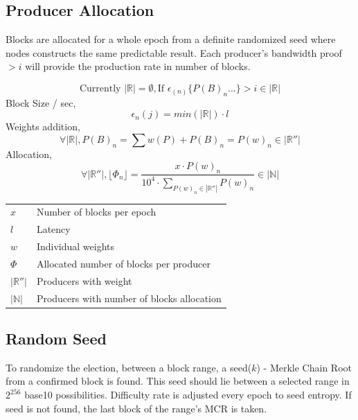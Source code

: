 \documentclass[a4paper,10pt]{article}
\makeatletter
\newenvironment{conditions}
  {\par\vspace{\abovedisplayskip}\noindent\begin{tabular}{>{$}l<{$} @{${}={}$} l}}
  {\end{tabular}\par\vspace{\belowdisplayskip}}
\makeatother
\begin{document}
\subsection{Producer Allocation}

Blocks are allocated for a whole epoch from a definite randomized seed where nodes constructs the same predictable result. Each producer's bandwidth proof $> i$ will provide the production rate in number of blocks.

\begin{equation*}
\text{Currently }|\mathbb{R}| = \emptyset, 
\text{If } \epsilon_{(n)}\{P(B)_n...\} > i \in |\mathbb{R}|
\end{equation*}
Block Size / sec,
\begin{equation*}
\epsilon_{n}(j)=min(|\mathbb{R}|) \cdot l
\end{equation*}
Weights addition,
\begin{equation*}
\forall |\mathbb{R}|, P(B)_n = \sum w(P) + P(B)_n = P(w)_n  \in |\mathbb{R}''|
\end{equation*}
Allocation,
\begin{equation*}
\forall |\mathbb{R}''|, \lfloor \Phi_{n} \rfloor = \frac{x \cdot P(w)_n}{10^4 \cdot \sum_{P(w)_n \in |\mathbb{R}''|} P(w)_n} \in |\mathbb{N}|
\end{equation*}

\begin{conditions}
x & Number of blocks per epoch\\
l & Latency\\
w & Individual weights\\
\Phi & Allocated number of blocks per producer\\
|\mathbb{R}''| & Producers with weight \\
|\mathbb{N}| & Producers with number of blocks allocation

\end{conditions}

\subsection{Random Seed}

To randomize the election, between a block range, a seed($k$) - Merkle Chain Root from a confirmed block is found. This seed should lie between a selected range in $2^{256}$ base10 possibilities. Difficulty rate is adjusted every epoch to seed entropy. If seed is not found, the last block of the range's MCR is taken. 
\end{document}
